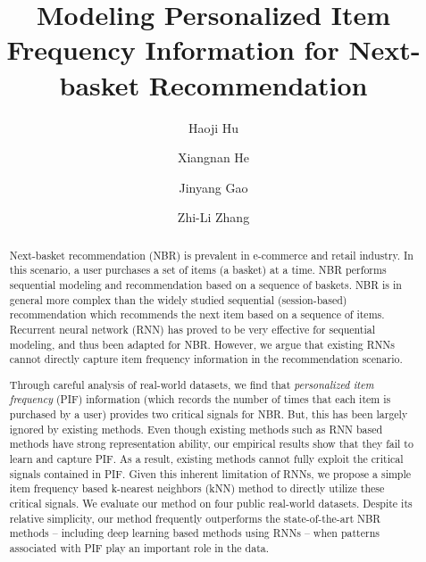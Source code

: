 \documentclass[sigconf]{acmart}
\begin{document}
\fancyhead{}

\title{Modeling Personalized Item Frequency Information for Next-basket  Recommendation}






\author{Haoji Hu}

\author{Xiangnan He}

\author{Jinyang Gao}

\author{Zhi-Li Zhang}




\renewcommand{\shortauthors}{.}

\begin{abstract}
Next-basket recommendation (NBR) is prevalent in e-commerce and retail industry. In this scenario, a user purchases a set of items (a basket) at a time. NBR performs sequential modeling and recommendation based on a sequence of baskets. NBR is in general more complex than the widely studied sequential  (session-based) recommendation which recommends the next item based on a sequence of items. Recurrent neural network (RNN) has proved to be very effective for sequential modeling, and thus been adapted for NBR. However, we argue that existing RNNs cannot directly capture item frequency information in the recommendation scenario. 

 Through careful analysis of real-world datasets, we find that {\em personalized item frequency} (PIF) information (which records the number of times that each item is purchased by a user) provides two critical signals for NBR. But, this has been largely ignored by existing methods. Even though existing methods such as  RNN based methods have strong representation ability, our empirical results show that they fail  to learn and  capture PIF. As a result, existing methods cannot fully exploit the critical signals  contained in PIF. 
 Given this inherent  limitation of RNNs,  we propose a simple item  frequency based  k-nearest neighbors (kNN) method to directly utilize these critical signals. 
 We evaluate our method on four public real-world datasets. Despite its relative simplicity, our method frequently outperforms the state-of-the-art NBR methods -- including deep learning based methods using RNNs -- when patterns associated with PIF play an important role in the data. 
\end{abstract}
\end{document}

